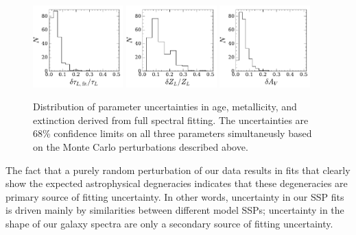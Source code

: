  
\begin{figure}
  \centering
  \includegraphics[width=0.31\textwidth]{891_2/figs/fit_uncertainty_MLWA.pdf}
  \includegraphics[width=0.31\textwidth]{891_2/figs/fit_uncertainty_MLWZ.pdf}
  \includegraphics[width=0.31\textwidth]{891_2/figs/fit_uncertainty_TAUV.pdf}
  \caption[Distributions of fit uncertainties in $\tau_L$, $Z_L$,
    $A_V$]{\fixspacing\label{891_2:fig:fit_err_hist}Distribution of
    parameter uncertainties in age, metallicity, and extinction
    derived from full spectral fitting.  The uncertainties are 68\%
    confidence limits on all three parameters simultaneusly based on
    the Monte Carlo perturbations described above.}
\end{figure}

The fact that a purely random perturbation of our data results in fits
that clearly show the expected astrophysical degneracies indicates
that these degeneracies are primary source of fitting uncertainty. In
other words, uncertainty in our SSP fits is driven mainly by
similarities between different model SSPs; uncertainty in the shape of
our galaxy spectra are only a secondary source of fitting uncertainty.


